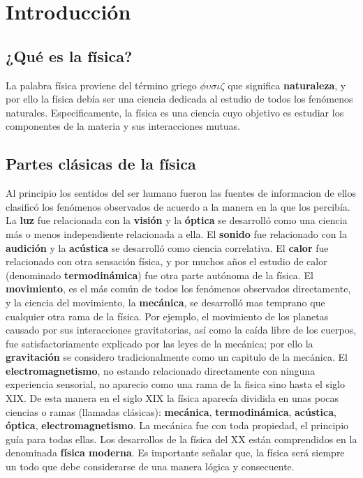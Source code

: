 \documentclass[12pt,a4paper]{book}
\begin{document}
    \thispagestyle{empty}
    
    

    \setcounter{page}{1}
    \tableofcontents
    \clearpage

    \chapter{Introducción}

    \section{¿Qué es la física?}

    La palabra física proviene del término griego $\phi\upsilon\sigma\iota\zeta$ que significa \textbf{naturaleza}, y por ello la física
    debía ser una ciencia dedicada al estudio de todos los fenómenos naturales. Especificamente, la física es una ciencia cuyo objetivo
    es estudiar los componentes de la materia y sus interacciones mutuas.

    \section{Partes clásicas de la física}

    Al principio los sentidos del ser humano fueron las fuentes de informacion de ellos clasificó los fenómenos observados de acuerdo a la manera
    en la que los percibía.\\
    La \textbf{luz} fue relacionada con la \textbf{visión} y la \textbf{óptica} se desarrolló como una ciencia más o menos independiente relacionada
    a ella. El \textbf{sonido} fue relacionado con la \textbf{audición} y la \textbf{acústica} se desarrolló como ciencia correlativa. El \textbf{calor}
    fue relacionado con otra sensación física, y por muchos años el estudio de calor (denominado \textbf{termodinámica}) fue otra parte autónoma
    de la física. El \textbf{movimiento}, es el más común de todos los fenómenos observados directamente, y la ciencia del movimiento, la \textbf{mecánica},
    se desarrolló mas temprano que cualquier otra rama de la física. Por ejemplo, el movimiento de los planetas causado por sus interacciones gravitatorias,
    así como la caída libre de los cuerpos, fue satisfactoriamente explicado por las leyes de la mecánica; por ello la \textbf{gravitación} se considero
    tradicionalmente como un capitulo de la mecánica. El \textbf{electromagnetismo}, no estando relacionado directamente con ninguna experiencia sensorial,
    no aparecio como una rama de la fisica sino hasta el siglo XIX. De esta manera en el siglo XIX la física aparecía dividida en unas pocas ciencias o ramas
    (llamadas clásicas): \textbf{mecánica}, \textbf{termodinámica}, \textbf{acústica}, \textbf{óptica}, \textbf{electromagnetismo}. La mecánica fue con toda
    propiedad, el principio guía para todas ellas. Los desarrollos de la física del XX están comprendidos en la denominada \textbf{física moderna}.
    Es importante señalar que, la física será siempre un todo que debe considerarse de una manera lógica y consecuente.
\end{document}
